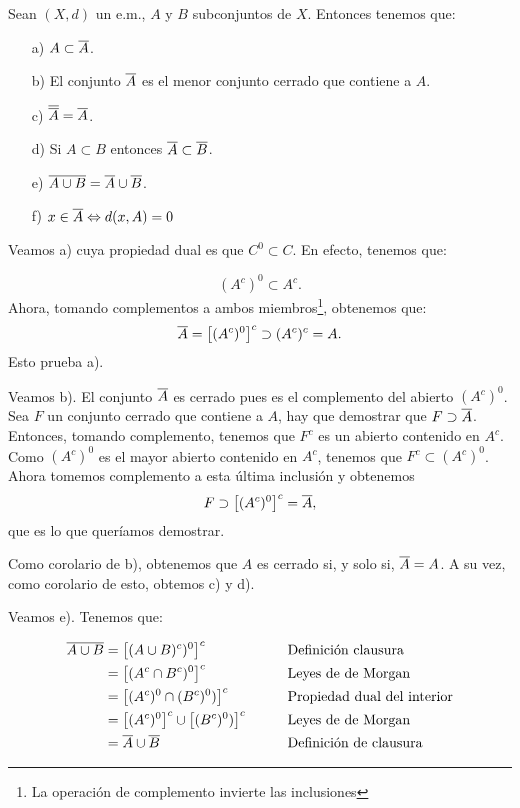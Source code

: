 \begin{teorema}{} Sean $(X,d)$ un e.m., $A$ y $B$ subconjuntos de
$X$. Entonces tenemos que:
\begin{itemize}
\item[a)] $A\subset \overline{A}$.
\item[b)] El conjunto $\overline{A}$ es el menor conjunto cerrado que
contiene a $A$.
\item[c)] $\overline{\overline{A}}=\overline{A}$.
\item[d)] Si $A\subset B$ entonces $\overline{A}\subset \overline{B}$.
\item[e)]$\overline{A\cup B}=\overline{A}\cup \overline{B}$.
\item[f)]$x\in \overline{A}\Leftrightarrow d(x,A)=0$
\end{itemize}
\end{teorema}
\begin{demo} Veamos a) cuya propiedad dual es que $C^0\subset C$.
En efecto, tenemos que:

\[(A^c)^0\subset A^c.\]
Ahora, tomando complementos a ambos miembros\footnote{La
operación de complemento invierte las inclusiones}, obtenemos
que:
\[\overline{A}=\bigl[(A^c)^0\bigr]^c\supset (A^c)^c=A.\]
Esto prueba a).

Veamos b). El conjunto $\overline{A}$ es cerrado pues es el complemento
del abierto $(A^c)^0$. Sea $F$ un conjunto cerrado que contiene a
$A$, hay que demostrar que $F\supset \overline{A}$. Entonces, tomando
complemento, tenemos que $F^c$ es un abierto contenido en $A^c$.
Como $(A^c)^0$ es el mayor abierto contenido en $A^c$, tenemos que
$F^c\subset (A^c)^0$. Ahora tomemos complemento a esta última
inclusión y obtenemos
\[F\supset \bigl[(A^c)^0\bigr]^c=\overline{A},\]
que es lo que queríamos demostrar.

Como corolario de b), obtenemos que  $A$ es cerrado si, y solo si,
$\overline{A}=A$. A su vez, como corolario de esto, obtemos c) y d).

Veamos e). Tenemos que:

\begin{align}
  \overline{A\cup B}&=\bigl[(A\cup B)^c)^0\bigr]^c         &\qquad &\text{Definición clausura}\notag \\
			 &=\bigl[(A^c\cap B^c)^0\bigr]^c    &&\text{Leyes de de         Morgan}\notag\\
			 &=\bigl[(A^c)^0\cap (B^c)^0)\bigr]^c &&\text{Propiedad dual del interior}\notag\\
			 &=\bigl[(A^c)^0\bigr]^c\cup \bigl[(B^c)^0)\bigr]^c &&\text{Leyes de de Morgan}\notag\\
			 &= \overline{A}\cup \overline{B}                     &&\text{Definición de
			 clausura}\notag
  \end{align}



\end{demo}
